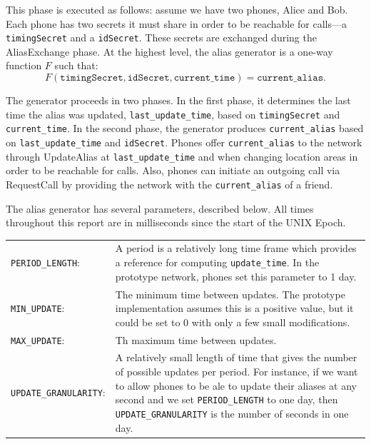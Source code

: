 \documentclass[11pt]{article}
\begin{document}
This phase is executed as follows: assume we have two phones, Alice and Bob. Each phone has two secrets it must share in order to be reachable for calls---a \texttt{timingSecret} and a \texttt{idSecret}. These secrets are exchanged during the AliasExchange phase. At the highest level, the alias generator is a one-way function $F$ such that:
\begin{equation*}
	F(\texttt{timingSecret}, \texttt{idSecret}, \texttt{current_time}) = \texttt{current_alias}.
\end{equation*}

The generator proceeds in two phases. In the first phase, it determines the last time the alias was updated, \texttt{last_update_time}, based on \texttt{timingSecret} and \texttt{current_time}. In the second phase, the generator produces \texttt{current_alias} based on \texttt{last_update_time} and \texttt{idSecret}. Phones offer \texttt{current_alias} to the network through UpdateAlias at \texttt{last_update_time} and when changing location areas in order to be reachable for calls. Also, phones can initiate an outgoing call via RequestCall by providing the network with the \texttt{current_alias} of a friend. 

The alias generator has several parameters, described below. All times throughout this report are in milliseconds since the start of the UNIX Epoch.

\begin{center}
\begin{tabular}{p{4cm} p{9cm} }
\texttt{PERIOD_LENGTH}: &
			A period is a relatively long time frame which provides a reference for computing \texttt{update_time}. In the prototype network, phones set this parameter to 1 day. \\[0.5cm]
\texttt{MIN_UPDATE}: &
			The minimum time between updates. The prototype implementation assumes this is a positive value, but it could be set to 0 with only a few small modifications. \\[0.5cm]
\texttt{MAX_UPDATE}: &
			Th maximum time between updates. \\[0.5cm]
\texttt{UPDATE_GRANULARITY}: & 
			A relatively small length of time that gives the number of possible updates per period. For instance, if we want to allow phones to be ale to update their aliases at any second and we set \texttt{PERIOD_LENGTH} to one day, then \texttt{UPDATE_GRANULARITY} is the number of seconds in one day. 
\end{tabular}
\end{center}
\end{document}
